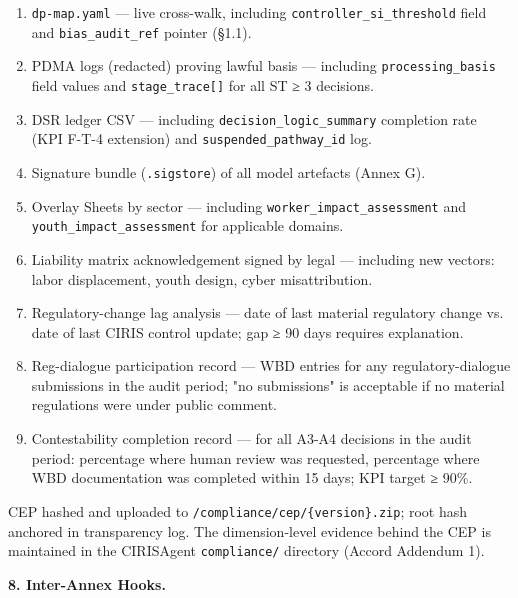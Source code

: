 \documentclass[11pt]{article}
\begin{document}
\begin{enumerate}\setlength\itemsep{0pt}
\item \texttt{dp-map.yaml} — live cross-walk, including \texttt{controller\_si\_threshold} field and \texttt{bias\_audit\_ref} pointer (§1.1).
\item PDMA logs (redacted) proving lawful basis — including \texttt{processing\_basis} field values and \texttt{stage\_trace[]} for all ST ≥ 3 decisions.
\item DSR ledger CSV — including \texttt{decision\_logic\_summary} completion rate (KPI F-T-4 extension) and \texttt{suspended\_pathway\_id} log.
\item Signature bundle (\texttt{.sigstore}) of all model artefacts (Annex G).
\item Overlay Sheets by sector — including \texttt{worker\_impact\_assessment} and \texttt{youth\_impact\_assessment} for applicable domains.
\item Liability matrix acknowledgement signed by legal — including new vectors: labor displacement, youth design, cyber misattribution.
\item Regulatory-change lag analysis — date of last material regulatory change vs. date of last CIRIS control update; gap ≥ 90 days requires explanation.
\item Reg-dialogue participation record — WBD entries for any regulatory-dialogue submissions in the audit period; "no submissions" is acceptable if no material regulations were under public comment.
\item Contestability completion record — for all A3-A4 decisions in the audit period: percentage where human review was requested, percentage where WBD documentation was completed within 15 days; KPI target ≥ 90\%.
\end{enumerate}


CEP hashed and uploaded to \texttt{/compliance/cep/\{version\}.zip}; root hash anchored in transparency log. The dimension-level evidence behind the CEP is maintained in the CIRISAgent \texttt{compliance/} directory (Accord Addendum 1).


\textbf{8. Inter-Annex Hooks.}
\end{document}
